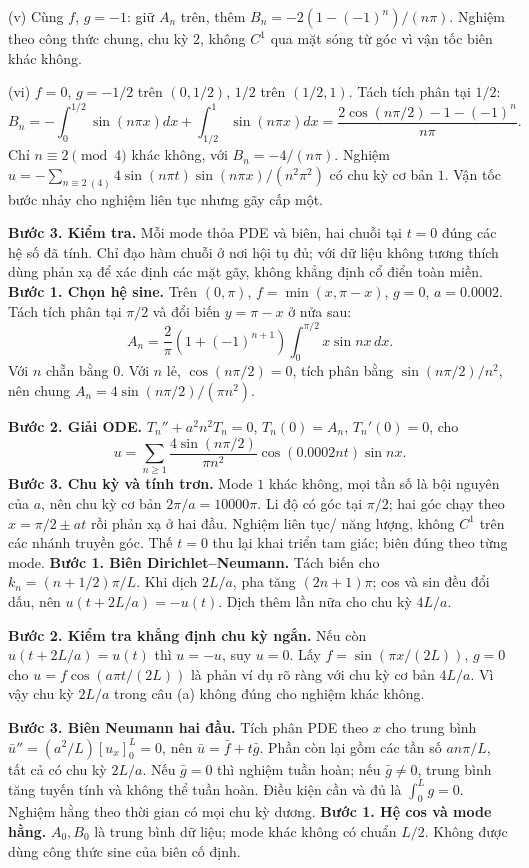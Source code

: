 (v) Cùng $f$, $g=-1$: giữ $A_n$ trên, thêm $B_n=-2(1-(-1)^n)/(n\pi)$. Nghiệm theo công thức chung, chu kỳ $2$, không $C^1$ qua mặt sóng từ góc vì vận tốc biên khác không.

(vi) $f=0$, $g=-1/2$ trên $(0,1/2)$, $1/2$ trên $(1/2,1)$. Tách tích phân tại $1/2$:
\[B_n=-\int_0^{1/2}\sin(n\pi x)dx+\int_{1/2}^1\sin(n\pi x)dx
=\frac{2\cos(n\pi/2)-1-(-1)^n}{n\pi}.\]
Chỉ $n\equiv2\pmod4$ khác không, với $B_n=-4/(n\pi)$. Nghiệm $u=-\sum_{n\equiv2\ (4)}4\sin(n\pi t)\sin(n\pi x)/(n^2\pi^2)$ có chu kỳ cơ bản $1$. Vận tốc bước nhảy cho nghiệm liên tục nhưng gãy cấp một.

\textbf{Bước 3. Kiểm tra.} Mỗi mode thỏa PDE và biên, hai chuỗi tại $t=0$ đúng các hệ số đã tính. Chỉ đạo hàm chuỗi ở nơi hội tụ đủ; với dữ liệu không tương thích dùng phản xạ để xác định các mặt gãy, không khẳng định cổ điển toàn miền.
\textbf{Bước 1. Chọn hệ sine.} Trên $(0,\pi)$, $f=\min(x,\pi-x)$, $g=0$, $a=0.0002$. Tách tích phân tại $\pi/2$ và đổi biến $y=\pi-x$ ở nửa sau:
\[A_n=\frac2\pi(1+(-1)^{n+1})\int_0^{\pi/2}x\sin nx\,dx.\]
Với $n$ chẵn bằng $0$. Với $n$ lẻ, $\cos(n\pi/2)=0$, tích phân bằng $\sin(n\pi/2)/n^2$, nên chung $A_n=4\sin(n\pi/2)/(\pi n^2)$.

\textbf{Bước 2. Giải ODE.} $T_n''+a^2n^2T_n=0$, $T_n(0)=A_n$, $T_n'(0)=0$, cho
\[u=\sum_{n\ge1}\frac{4\sin(n\pi/2)}{\pi n^2}\cos(0.0002nt)\sin nx.\]
\textbf{Bước 3. Chu kỳ và tính trơn.} Mode $1$ khác không, mọi tần số là bội nguyên của $a$, nên chu kỳ cơ bản $2\pi/a=10000\pi$. Li độ có góc tại $\pi/2$; hai góc chạy theo $x=\pi/2\pm at$ rồi phản xạ ở hai đầu. Nghiệm liên tục/ năng lượng, không $C^1$ trên các nhánh truyền góc. Thế $t=0$ thu lại khai triển tam giác; biên đúng theo từng mode.
\textbf{Bước 1. Biên Dirichlet–Neumann.} Tách biến cho $k_n=(n+1/2)\pi/L$. Khi dịch $2L/a$, pha tăng $(2n+1)\pi$; cos và sin đều đổi dấu, nên $u(t+2L/a)=-u(t)$. Dịch thêm lần nữa cho chu kỳ $4L/a$.

\textbf{Bước 2. Kiểm tra khẳng định chu kỳ ngắn.} Nếu còn $u(t+2L/a)=u(t)$ thì $u=-u$, suy $u=0$. Lấy $f=\sin(\pi x/(2L))$, $g=0$ cho $u=f\cos(a\pi t/(2L))$ là phản ví dụ rõ ràng với chu kỳ cơ bản $4L/a$. Vì vậy chu kỳ $2L/a$ trong câu (a) không đúng cho nghiệm khác không.

\textbf{Bước 3. Biên Neumann hai đầu.} Tích phân PDE theo $x$ cho trung bình $\bar u''=(a^2/L)[u_x]_0^L=0$, nên $\bar u=\bar f+t\bar g$. Phần còn lại gồm các tần số $an\pi/L$, tất cả có chu kỳ $2L/a$. Nếu $\bar g=0$ thì nghiệm tuần hoàn; nếu $\bar g\ne0$, trung bình tăng tuyến tính và không thể tuần hoàn. Điều kiện cần và đủ là $\int_0^Lg=0$. Nghiệm hằng theo thời gian có mọi chu kỳ dương.
\textbf{Bước 1. Hệ cos và mode hằng.} $A_0,B_0$ là trung bình dữ liệu; mode khác không có chuẩn $L/2$. Không được dùng công thức sine của biên cố định.

